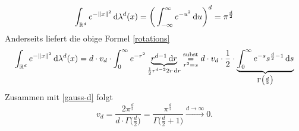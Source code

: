 \begin{example}
\begin{equation}\label{gauss-d}
\int_{\mathbb{R}^d}e^{-\|x\|^2}\, \mathrm{d}\lambda^d(x)=\bigg(\int_{-\infty}^\infty e^{-u^2}\, \mathrm{d} u\bigg)^d = \pi^{\frac{d}{2}}
\end{equation}
Anderseits liefert die obige Formel \eqref{rotations}
$$\int_{\mathbb{R}^d} e^{-\|x\|^2} \, \mathrm{d}\lambda^d(x) = d\cdot v_d \cdot \int_0^\infty e^{-r^2} \underbrace{r^{d-1}\, \mathrm{d} r}_{\frac{1}{2}r^{d-2}2r\, \mathrm{d} r} \underset{r^2=s}{\overset{\text{subst}}=} d\cdot v_d \cdot \frac{1}{2}\cdot \underbrace{\int_0^\infty e^{-s}s^{\frac{d}{2}-1}\, \mathrm{d} s}_{\Gamma\big(\frac{d}{2}\big)} $$
Zusammen mit \eqref{gauss-d} folgt
$$\boxed{v_d = \frac{2\pi^{\frac{d}{2}}}{d \cdot \Gamma\big(\frac{d}{2}\big)}=\frac{\pi^{\frac{d}{2}}}{\Gamma\big(\frac{d}{2}+1 \big)}} \overset{d \to \infty}\longrightarrow 0.$$
\end{example}

